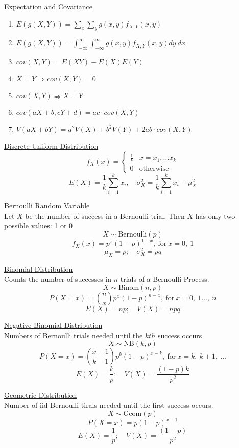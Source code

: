 \documentclass[a4paper,1pt,landscape]{article}
\begin{document}
\begin{multicols}{3}
\underline{Expectation and Covariance}
\begin{enumerate}
    \item $E(g(X,Y)) = \sum_x \sum_y g(x,y) f_{X,Y}(x,y)$
    \item $E(g(X,Y)) = \int_{-\infty}^\infty \int_{-\infty}^\infty g(x,y) f_{X,Y}(x,y)dy\ dx$
    \item $cov(X,Y) = E(XY) - E(X)E(Y)$
    \item $X \perp Y \Rightarrow cov(X,Y) = 0$
    \item $cov(X,Y) \nRightarrow X \perp Y$
    \item $cov(aX + b, cY + d) = ac\cdot cov(X,Y)$
    \item $V(aX+bY) = a^2V(X) + b^2V(Y) + 2ab\cdot cov(X,Y)$
\end{enumerate}

\underline{Discrete Uniform Distribution}
\begin{equation*}
f_X(x)=
    \begin{cases}
        \frac{1}{k} & x = x_1, \ldots x_k\\
        0 & \text{otherwise}
    \end{cases}
\end{equation*}
$$E(X) = \frac{1}{k}\sum_{i=1}^k x_i, \quad \sigma_X^2 = \frac{1}{k}\sum_{i=1}^k x_i - \mu_X^2$$

\underline{Bernoulli Random Variable}\\
Let $X$ be the number of success in a Bernoulli trial. Then $X$ has only two possible values: 1 or 0
$$X \sim \text{Bernoulli}(p)$$
$$f_X(x) = p^x (1-p)^{1-x},\ \text{for}\ x = 0,\ 1$$
$$\mu_X = p; \quad \sigma_X^2 = pq$$


\underline{Binomial Distribution}\\
Counts the number of successes in $n$ trials of a Bernoulli Process.
$$X \sim \text{Binom}(n,p)$$
$$P(X=x) = \binom{n}{x} p^x (1-p)^{n-x},\ \text{for}\ x = 0,\ 1\ldots ,\ n$$
$$E(X) = np; \quad V(X) = npq$$

\underline{Negative Binomial Distribution}\\
Numbers of Bernoulli trials needed until the $kth$ success occurs
$$X \sim \text{NB}(k,p)$$
$$P(X=x) = \binom{x-1}{k-1} p^k (1-p)^{x-k},\ \text{for}\ x = k,\ k+1,\ \ldots$$
$$E(X) = \frac{k}{p}; \quad V(X) = \frac{(1-p)k}{p^2}$$

\underline{Geometric Distribution}\\
Number of iid Bernoulli tirals needed until the first success occurs.
$$X \sim \text{Geom}(p)$$
$$P(X=x) = p (1-p)^{x-1}$$
$$E(X) = \frac{1}{p}; \quad V(X) = \frac{(1-p)}{p^2}$$


\end{multicols}
\end{document}
